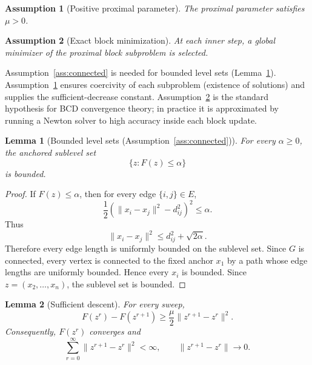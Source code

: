 \documentclass[11pt]{article}
\newtheorem{lemma}{Lemma}
\newtheorem{assumption}{Assumption}
\begin{document}
\begin{assumption}[Positive proximal parameter]\label{ass:mu}
The proximal parameter satisfies $\mu>0$.
\end{assumption}

\begin{assumption}[Exact block minimization]\label{ass:exact}
At each inner step, a global minimizer of the proximal block subproblem is selected.
\end{assumption}

Assumption~\ref{ass:connected} is needed for bounded level sets (Lemma~\ref{lem:bounded}).  Assumption~\ref{ass:mu} ensures coercivity of each subproblem (existence of solutions) and supplies the sufficient-decrease constant.  Assumption~\ref{ass:exact} is the standard hypothesis for BCD convergence theory; in practice it is approximated by running a Newton solver to high accuracy inside each block update.

\begin{lemma}[Bounded level sets (Assumption~\ref{ass:connected})]\label{lem:bounded}
For every \(\alpha\ge0\), the anchored sublevel set
\[
    \{z:F(z)\le \alpha\}
\]
is bounded.
\end{lemma}

\begin{proof}
If \(F(z)\le \alpha\), then for every edge \(\{i,j\}\in E\),
\[
    \frac12\left(\|x_i-x_j\|^2-d_{ij}^2\right)^2\le \alpha.
\]
Thus
\[
    \|x_i-x_j\|^2
    \le
    d_{ij}^2+\sqrt{2\alpha}.
\]
Therefore every edge length is uniformly bounded on the sublevel set.  Since \(G\) is connected, every vertex is connected to the fixed anchor \(x_1\) by a path whose edge lengths are uniformly bounded.  Hence every \(x_i\) is bounded.  Since \(z=(x_2,\ldots,x_n)\), the sublevel set is bounded.
\end{proof}

\begin{lemma}[Sufficient descent]
For every sweep,
\[
    F(z^r)-F(z^{r+1})
    \ge
    \frac{\mu}{2}\|z^{r+1}-z^r\|^2.
\]
Consequently, \(F(z^r)\) converges and
\[
    \sum_{r=0}^{\infty}\|z^{r+1}-z^r\|^2<\infty,
    \qquad
    \|z^{r+1}-z^r\|\to0.
\]
\end{lemma}
\end{document}
